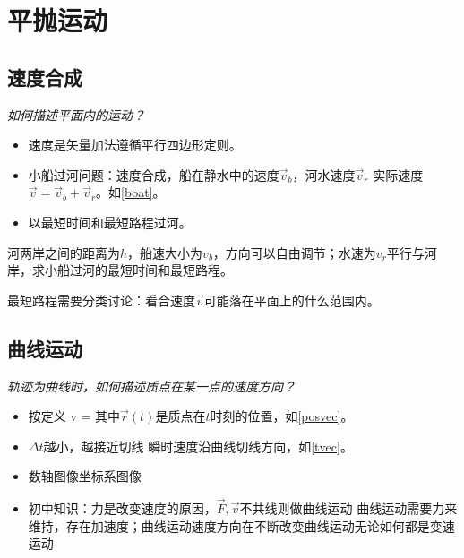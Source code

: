 \documentclass[a4paper,9pt]{ctexart}
\begin{document}
\newpage
\section{平抛运动}
\subsection{速度合成}
\emph{如何描述平面内的运动？}
\begin{itemize}
\item
速度是矢量\so 加法遵循平行四边形定则。
\item
小船过河问题：速度合成，船在静水中的速度$\vec v_b$，河水速度$\vec v_r$ \so 实际速度$\vec v = \vec v_b + \vec v_r$。如\cref{boat}。
\item
以最短时间和最短路程过河。
\end{itemize}
\begin{eg}
河两岸之间的距离为$h$，船速大小为$v_b$，方向可以自由调节；水速为$v_r$平行与河岸，求小船过河的最短时间和最短路程。
\end{eg}
\begin{ans}
最短路程需要分类讨论：看合速度$\vec v$可能落在平面上的什么范围内。
\vspace{6cm}
\end{ans}

\subsection{曲线运动}
\emph{轨迹为曲线时，如何描述质点在某一点的速度方向？}
\begin{itemize}
\item
按定义
\beq
\vec v = 
\eeq
其中$\vec r(t)$是质点在$t$时刻的位置，如\cref{posvec}。
\item
$\Delta t$越小，越接近切线 \so 瞬时速度沿曲线切线方向，如\cref{tvec}。
\item
数轴图像\so 坐标系图像
\item
初中知识：力是改变速度的原因，$\vec F,\vec v$不共线则做曲线运动 \so 曲线运动需要力来维持，存在加速度；曲线运动速度方向在不断改变\so 曲线运动无论如何都是变速运动
\end{itemize}
\end{document}
